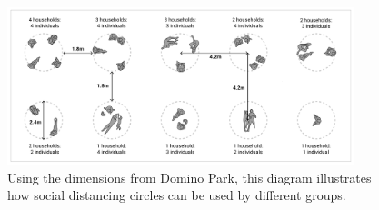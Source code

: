 

\begin{figure}[h]
  \centering
  \includegraphics[width=0.9\textwidth]{images/gatherings/circle_dims.png}
  \captionsetup{width=0.9\linewidth}
  \caption[Outdoor gathering circles]{Using the dimensions from Domino Park, this diagram illustrates how social distancing circles can be used by different groups.}
  \label{fig:circle_dims}
\end{figure}

